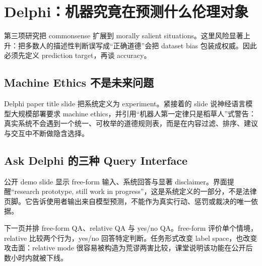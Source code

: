 \section{Delphi：机器究竟在预测什么伦理对象}

第三项研究把 commonsense 扩展到 morally salient situations。这里风险显著上升：把多数人的描述性判断误写成“正确道德”会把 dataset bias 包装成权威。因此必须先定义 prediction target，再谈 accuracy。

\subsection{Machine Ethics 不是未来问题}

Delphi paper title slide 把系统定义为 experiment。紧接着的 slide 说神经语言模型大规模部署要求 machine ethics，并引用“机器人第一定律只是稻草人”式警告：真实系统不会遇到一个统一、可枚举的道德规则表，而是在内容过滤、排序、建议与交互中不断做隐含选择。




\subsection{Ask Delphi 的三种 Query Interface}

公开 demo slide 显示 free-form 输入、系统回答与显著 disclaimer。界面提醒“research prototype, still work in progress”，这是系统定义的一部分，不是法律页脚。它告诉使用者输出来自模型预测，不能作为真实行动、惩罚或裁决的唯一依据。


下一页并排 free-form QA、relative QA 与 yes/no QA。free-form 评价单个情境，relative 比较两个行为，yes/no 回答特定判断。任务形式改变 label space，也改变攻击面：relative mode 很容易被构造为荒谬两害比较，课堂说明该功能在公开后数小时内就被下线。


